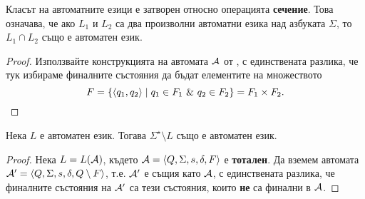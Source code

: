 \begin{cor}
  Класът на автоматните езици е затворен относно операцията {\bf сечение}.
  Това означава, че ако $L_1$ и $L_2$ са два произволни автоматни езика над азбуката $\Sigma$, то $L_1\cap L_2$
  също е автоматен език.
\end{cor}
\begin{proof}
  Използвайте конструкцията на автомата $\mathcal{A}$ от ,
  с единствената разлика, че тук избираме финалните състояния да бъдат елементите на множеството
  \[F = \{\pair{q_1,q_2} \mid q_1 \in F_1\ \&\ q_2 \in F_2\} = F_1\times F_2.\]
\end{proof}

\begin{prop}
  \label{pr:automata-complement}
  Нека $L$ е автоматен език.
  Тогава $\Sigma^\star\setminus L$ също е автоматен език.
\end{prop}
\begin{proof}
  Нека $L = L(\mathcal{A})$, където $\mathcal{A} = \langle{Q,\Sigma,s,\delta,F}\rangle$ е {\bf тотален}.
  Да вземем автомата $\mathcal{A}' = \langle{Q,\Sigma,s,\delta,Q\setminus F}\rangle$,
  т.е. $\mathcal{A}'$ е същия като $\mathcal{A}$, с единствената разлика, че финалните състояния на $\mathcal{A}'$
  са тези състояния, които {\bf не} са финални в $\mathcal{A}$.
\end{proof}


